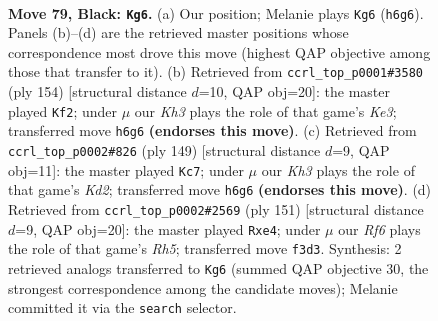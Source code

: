 \documentclass[11pt]{article}
\begin{document}
\clearpage

\begin{figure}[p]\centering
\begin{subfigure}{0.46\textwidth}\centering
\resizebox{\linewidth}{!}{%
\newchessgame
\chessboard[
  setfen={8/R7/P6k/5p2/b4P2/5r2/8/7K b - - 0 79},
  showmover=false,
  pgfstyle=straightmove, color=movearrow, markmove={h6-g6}
]}
\caption{}
\end{subfigure}\hfill
\begin{subfigure}{0.46\textwidth}\centering
\resizebox{\linewidth}{!}{%
\newchessgame
\chessboard[
  setfen={8/4k3/7P/6R1/r5p1/4K3/8/8 w - - 1 78},
  showmover=false,
  pgfstyle=straightmove, color=movearrow, markmove={e3-f2}
]}
\caption{}
\end{subfigure}
\\[4pt]
\begin{subfigure}{0.46\textwidth}\centering
\resizebox{\linewidth}{!}{%
\newchessgame
\chessboard[
  setfen={7R/3k4/8/1K4p1/1P6/5r1P/8/8 b - - 0 75},
  showmover=false,
  pgfstyle=straightmove, color=movearrow, markmove={d7-c7}
]}
\caption{}
\end{subfigure}\hfill
\begin{subfigure}{0.46\textwidth}\centering
\resizebox{\linewidth}{!}{%
\newchessgame
\chessboard[
  setfen={8/8/p1k5/6RP/4P2r/8/8/3K4 b - - 0 76},
  showmover=false,
  pgfstyle=straightmove, color=movearrow, markmove={h4-e4}
]}
\caption{}
\end{subfigure}
\caption{\textbf{Move 79, Black: \texttt{Kg6}.} (a) Our position; Melanie plays \texttt{Kg6} (\texttt{h6g6}). Panels (b)--(d) are the retrieved master positions whose correspondence most drove this move (highest QAP objective among those that transfer to it). (b) Retrieved from \texttt{ccrl\_top\_p0001\#3580} (ply 154) [structural distance $d$=10, QAP obj=20]: the master played \texttt{Kf2}; under $\mu$ our \emph{Kh3} plays the role of that game's \emph{Ke3}; transferred move \texttt{h6g6} \textbf{(endorses this move)}. (c) Retrieved from \texttt{ccrl\_top\_p0002\#826} (ply 149) [structural distance $d$=9, QAP obj=11]: the master played \texttt{Kc7}; under $\mu$ our \emph{Kh3} plays the role of that game's \emph{Kd2}; transferred move \texttt{h6g6} \textbf{(endorses this move)}. (d) Retrieved from \texttt{ccrl\_top\_p0002\#2569} (ply 151) [structural distance $d$=9, QAP obj=20]: the master played \texttt{Rxe4}; under $\mu$ our \emph{Rf6} plays the role of that game's \emph{Rh5}; transferred move \texttt{f3d3}. Synthesis: 2 retrieved analogs transferred to \texttt{Kg6} (summed QAP objective 30, the strongest correspondence among the candidate moves); Melanie committed it via the \texttt{search} selector.}
\label{fig:thought-m157}
\end{figure}
\end{document}
